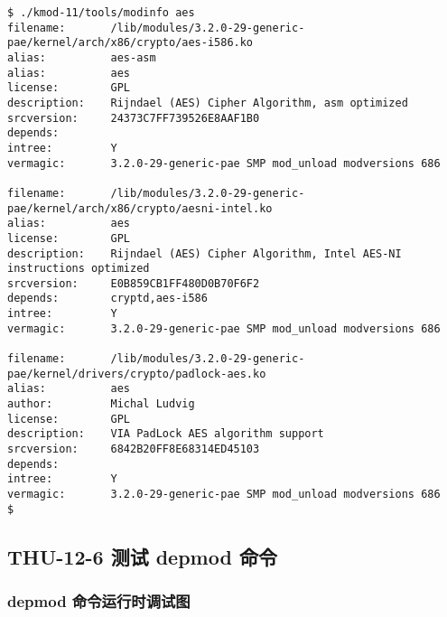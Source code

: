 \documentclass[11pt,a4paper]{article}
\begin{document}
{\begin{shaded}\begin{verbatim}
$ ./kmod-11/tools/modinfo aes 
filename:       /lib/modules/3.2.0-29-generic-pae/kernel/arch/x86/crypto/aes-i586.ko
alias:          aes-asm
alias:          aes
license:        GPL
description:    Rijndael (AES) Cipher Algorithm, asm optimized
srcversion:     24373C7FF739526E8AAF1B0
depends:        
intree:         Y
vermagic:       3.2.0-29-generic-pae SMP mod_unload modversions 686 

filename:       /lib/modules/3.2.0-29-generic-pae/kernel/arch/x86/crypto/aesni-intel.ko
alias:          aes
license:        GPL
description:    Rijndael (AES) Cipher Algorithm, Intel AES-NI instructions optimized
srcversion:     E0B859CB1FF480D0B70F6F2
depends:        cryptd,aes-i586
intree:         Y
vermagic:       3.2.0-29-generic-pae SMP mod_unload modversions 686 

filename:       /lib/modules/3.2.0-29-generic-pae/kernel/drivers/crypto/padlock-aes.ko
alias:          aes
author:         Michal Ludvig
license:        GPL
description:    VIA PadLock AES algorithm support
srcversion:     6842B20FF8E68314ED45103
depends:        
intree:         Y
vermagic:       3.2.0-29-generic-pae SMP mod_unload modversions 686 
$ 
\end{verbatim}\end{shaded}}
\subsection{THU-12-6 测试 depmod 命令}

\subsubsection{depmod 命令运行时调试图}
\end{document}
